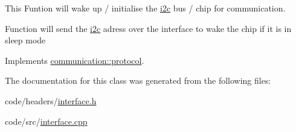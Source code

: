 This Funtion will wake up / initialise the \hyperlink{classcommunication_1_1i2c}{i2c} bus / chip for communication. 

Function will send the \hyperlink{classcommunication_1_1i2c}{i2c} adress over the interface to wake the chip if it is in sleep mode 

Implements \hyperlink{classcommunication_1_1protocol_aefe3def7b92b2eae8c98bfc542e27078}{communication\+::protocol}.



The documentation for this class was generated from the following files\+:\begin{DoxyCompactItemize}
\item 
code/headers/\hyperlink{interface_8h}{interface.\+h}\item 
code/src/\hyperlink{interface_8cpp}{interface.\+cpp}\end{DoxyCompactItemize}
